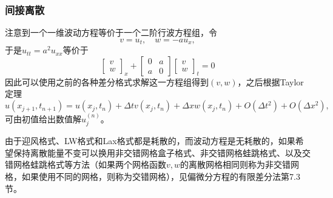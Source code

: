 \documentclass[a4paper,10pt]{ctexart}
\begin{document}
\subsubsection{间接离散}
注意到一个一维波动方程等价于一个二阶行波方程组，令
\[
    v = u_t,\quad w=-au_x,
\]
于是$ u_{tt} = a^2 u_{xx} $等价于
\begin{equation}
    \begin{bmatrix} 
        v\\ w
    \end{bmatrix}_x +
    \begin{bmatrix} 
        0 & a\\
        a & 0 
    \end{bmatrix} 
    \begin{bmatrix} 
        v\\ w
    \end{bmatrix}_t = 0
\end{equation}
因此可以使用之前的各种差分格式求解这一方程组得到$ (v,w) $，之后根据Taylor定理
\[
    u(x_{j+1},t_{n+1}) = u(x_j,t_n) + \Delta t v(x_j,t_n) + \Delta x w(x_j,t_n) + O(\Delta t^2)+O(\Delta x^2),
\]
可由初值给出数值解$ u^{(n)}_j $。

由于迎风格式、LW格式和Lax格式都是耗散的，而波动方程是无耗散的，如果希望保持离散能量不变可以换用非交错网格盒子格式、非交错网格蛙跳格式、以及交错网格蛙跳格式等方法（如果两个网格函数$ v,w $的离散网格相同则称为非交错网格，如果使用不同的网格，则称为交错网格），见偏微分方程的有限差分法第7.3节。
\end{document}
